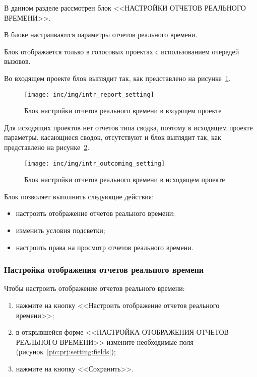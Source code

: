 В данном разделе рассмотрен блок <<НАСТРОЙКИ ОТЧЕТОВ РЕАЛЬНОГО ВРЕМЕНИ>>.

В блоке настраиваются параметры отчетов реального времени.

Блок отображается только в голосовых проектах с использованием очередей вызовов.

Во входящем проекте блок выглядит так, как представлено на рисунке~\ref{pic:incoming:setting}.

\begin{figure}[!ht]
    \centering
    \texttt{[image: inc/img/intr\_report\_setting]}
    \caption{Блок настройки отчетов реального времени в входящем проекте}
    \label{pic:incoming:setting}
\end{figure}

Для исходящих проектов нет отчетов типа сводка, поэтому в исходящем проекте параметры,
касающиеся сводок, отсутствуют и блок выглядит так, как представлено на рисунке~\ref{pic:outcoming:setting}.

\begin{figure}[!ht]
    \centering
    \texttt{[image: inc/img/intr\_outcoming\_setting]}
    \caption{Блок настройки отчетов реального времени в исходящем проекте}
    \label{pic:outcoming:setting}
\end{figure}

Блок позволяет выполнить следующие действия:
\begin{itemize}
    \item настроить отображение отчетов реального времени;
    \item изменить условия подсветки;
    \item настроить права на просмотр отчетов реального времени.
\end{itemize}

\subsubsection{Настройка отображения отчетов реального времени}

Чтобы настроить отображение отчетов реального времени:
\begin{enumerate}
    \item нажмите на кнопку <<Настроить отображение отчетов реального времени>>;
    \item в открывшейся форме <<НАСТРОЙКА ОТОБРАЖЕНИЯ ОТЧЕТОВ РЕАЛЬНОГО ВРЕМЕНИ>>
    измените необходимые поля (рисунок~\ref{pic:prj:setting:fields});
    \item нажмите на кнопку <<Сохранить>>.
\end{enumerate}

